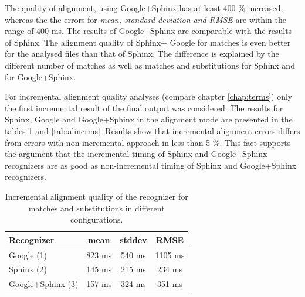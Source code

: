 The quality of alignment, using Google+Sphinx has at least 400 \% increased,
whereas the the errors for \textit {mean, standard deviation and RMSE} are within the range of
400 ms. The results of Google+Sphinx are comparable with the results of Sphinx.
The alignment quality of Sphinx+ Google for matches is even better for the
analysed files than that of Sphinx. The difference is explained by the different
number of matches as well as matches and substitutions for Sphinx and for
Google+Sphinx.

For incremental alignment quality analyses (compare chapter \ref{chap:terms})
only the first incremental result of the final output was considered. The results for Sphinx,
Google and Google+Sphinx in the alignment mode are presented in the tables
\ref{tab:alincrm} and \ref{tab:alincrms}. Results show that incremental
 alignment errors differs from errors with non-incremental approach in less than 5 \%. This fact supports the
argument that the incremental timing of Sphinx and Google+Sphinx
recognizers are as good as non-incremental timing of  Sphinx and Google+Sphinx
recognizers.
\begin {table}
\begin{center}
\caption {Incremental alignment quality of the recognizer for matches and 
substitutions in different configurations.}
    \begin{tabular}{ l  c  c  c }
    \toprule
    Recognizer & mean  & stddev & RMSE\\ \toprule
    Google (1)  & 823 ms & 540 ms & 1105 ms\\ 
    Sphinx (2)  &  145 ms & 215 ms & 234 ms \\ 
    Google+Sphinx (3) & 157 ms & 324 ms & 351 ms \\ 
    \bottomrule  
    \end{tabular}
    \label{tab:alincrm} 
\end{center}
\end {table}


